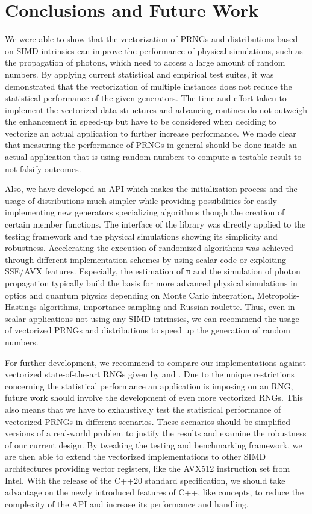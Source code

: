 \documentclass[crop=false]{stdlocal}
\begin{document}
\section{Conclusions and Future Work} %
\label{sec:conclusions}
  We were able to show that the vectorization of PRNGs and distributions based on SIMD intrinsics can improve the performance of physical simulations, such as the propagation of photons, which need to access a large amount of random numbers.
  By applying current statistical and empirical test suites, it was demonstrated that the vectorization of multiple instances does not reduce the statistical performance of the given generators.
  The time and effort taken to implement the vectorized data structures and advancing routines do not outweigh the enhancement in speed-up but have to be considered when deciding to vectorize an actual application to further increase performance.
  We made clear that measuring the performance of PRNGs in general should be done inside an actual application that is using random numbers to compute a testable result to not falsify outcomes.

  Also, we have developed an API which makes the initialization process and the usage of distributions much simpler while providing possibilities for easily implementing new generators specializing algorithms though the creation of certain member functions.
  The interface of the library was directly applied to the testing framework and the physical simulations showing its simplicity and robustness.
  Accelerating the execution of randomized algorithms was achieved through different implementation schemes by using scalar code or exploiting SSE/AVX features.
  Especially, the estimation of π and the simulation of photon propagation typically build the basis for more advanced physical simulations in optics and quantum physics depending on Monte Carlo integration, Metropolis-Hastings algorithms, importance sampling and Russian roulette.
  Thus, even in scalar applications not using any SIMD intrinsics, we can recommend the usage of vectorized PRNGs and distributions to speed up the generation of random numbers.

  For further development, we recommend to compare our implementations against vectorized state-of-the-art RNGs given by  and .
  Due to the unique restrictions concerning the statistical performance an application is imposing on an RNG, future work should involve the development of even more vectorized RNGs.
  This also means that we have to exhaustively test the statistical performance of vectorized PRNGs in different scenarios.
  These scenarios should be simplified versions of a real-world problem to justify the results and examine the robustness of our current design.
  By tweaking the testing and benchmarking framework, we are then able to extend the vectorized implementations to other SIMD architectures providing vector registers, like the AVX512 instruction set from Intel.
  With the release of the C++20 standard specification, we should take advantage on the newly introduced features of C++, like concepts, to reduce the complexity of the API and increase its performance and handling.
\end{document}
